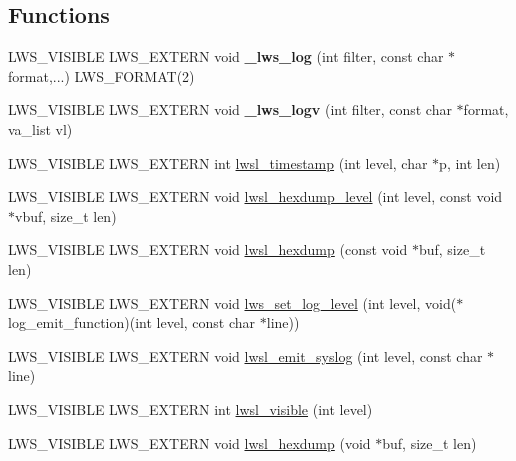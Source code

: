 \subsection*{Functions}
\begin{DoxyCompactItemize}
\item 
\mbox{\label{group__log_ga0cdc1065ae7f003d59a3c8525acf545e}} 
L\+W\+S\+\_\+\+V\+I\+S\+I\+B\+LE L\+W\+S\+\_\+\+E\+X\+T\+E\+RN void {\bfseries \+\_\+lws\+\_\+log} (int filter, const char $\ast$format,...) L\+W\+S\+\_\+\+F\+O\+R\+M\+AT(2)
\item 
\mbox{\label{group__log_ga74eb146969f0595e12ea835851b4588e}} 
L\+W\+S\+\_\+\+V\+I\+S\+I\+B\+LE L\+W\+S\+\_\+\+E\+X\+T\+E\+RN void {\bfseries \+\_\+lws\+\_\+logv} (int filter, const char $\ast$format, va\+\_\+list vl)
\item 
L\+W\+S\+\_\+\+V\+I\+S\+I\+B\+LE L\+W\+S\+\_\+\+E\+X\+T\+E\+RN int \hyperlink{group__log_ga42e39775c6b69b7251bdbf5a2cdd5dcd}{lwsl\+\_\+timestamp} (int level, char $\ast$p, int len)
\item 
L\+W\+S\+\_\+\+V\+I\+S\+I\+B\+LE L\+W\+S\+\_\+\+E\+X\+T\+E\+RN void \hyperlink{group__log_ga0981f080d7231c5ae0a8f7dfb51b1d0c}{lwsl\+\_\+hexdump\+\_\+level} (int level, const void $\ast$vbuf, size\+\_\+t len)
\item 
L\+W\+S\+\_\+\+V\+I\+S\+I\+B\+LE L\+W\+S\+\_\+\+E\+X\+T\+E\+RN void \hyperlink{group__log_ga3dbcc421d80599c337aaf1a2ba39ad3c}{lwsl\+\_\+hexdump} (const void $\ast$buf, size\+\_\+t len)
\item 
L\+W\+S\+\_\+\+V\+I\+S\+I\+B\+LE L\+W\+S\+\_\+\+E\+X\+T\+E\+RN void \hyperlink{group__log_ga244647f9e1bf0097ccdde66d74f41e26}{lws\+\_\+set\+\_\+log\+\_\+level} (int level, void($\ast$log\+\_\+emit\+\_\+function)(int level, const char $\ast$line))
\item 
L\+W\+S\+\_\+\+V\+I\+S\+I\+B\+LE L\+W\+S\+\_\+\+E\+X\+T\+E\+RN void \hyperlink{group__log_gab7c0fc936cc9f1eb58e2bb234c15147c}{lwsl\+\_\+emit\+\_\+syslog} (int level, const char $\ast$line)
\item 
L\+W\+S\+\_\+\+V\+I\+S\+I\+B\+LE L\+W\+S\+\_\+\+E\+X\+T\+E\+RN int \hyperlink{group__log_ga2d1819ad1645062fd83817e6f20e03b4}{lwsl\+\_\+visible} (int level)
\item 
L\+W\+S\+\_\+\+V\+I\+S\+I\+B\+LE L\+W\+S\+\_\+\+E\+X\+T\+E\+RN void \hyperlink{group__log_ga898b1f03872ad019f507d4e35bbefa90}{lwsl\+\_\+hexdump} (void $\ast$buf, size\+\_\+t len)
\end{DoxyCompactItemize}


